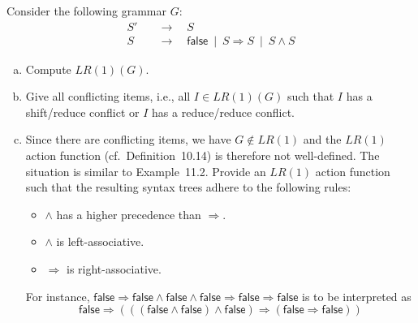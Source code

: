 \begin{exercise}{20}
Consider the following grammar $G$:
%
\newcommand{\false}{\textsf{false}}
\begin{align*}
%
   S'  & \quad \to \quad S \\
   S   & \quad \to \quad  \false ~\mid~ S \Rightarrow S ~\mid~ S \wedge S           
%
\end{align*}
%
%
\begin{enumerate}[(a)]
	  \item Compute $LR(1)(G)$.
	  \item Give all conflicting items, i.e., all $I \in LR(1)(G)$ such that $I$ has a
	   shift/reduce conflict or $I$ has a reduce/reduce conflict.
	  \item Since there are conflicting items, we have $G \not\in LR(1)$ and the $LR(1)$ action function (cf.\ Definition~10.14) is therefore not well-defined. The situation is similar to Example~11.2. Provide an $LR(1)$ action function such that the resulting syntax trees adhere to the following rules:
	  \begin{itemize}
	  	 \item $\wedge$ has a higher precedence than $\Rightarrow$.
	  	 \item $\wedge$ is left-associative.
	  	 \item $\Rightarrow$ is right-associative.
	  \end{itemize}
        For instance, $\false \Rightarrow \false \wedge \false \wedge \false \Rightarrow \false \Rightarrow \false$ is to be interpreted as 
        \[
        \false \Rightarrow (((\false \wedge \false) \wedge \false) \Rightarrow (\false \Rightarrow \false))
        \]
\end{enumerate}
%
\end{exercise}


